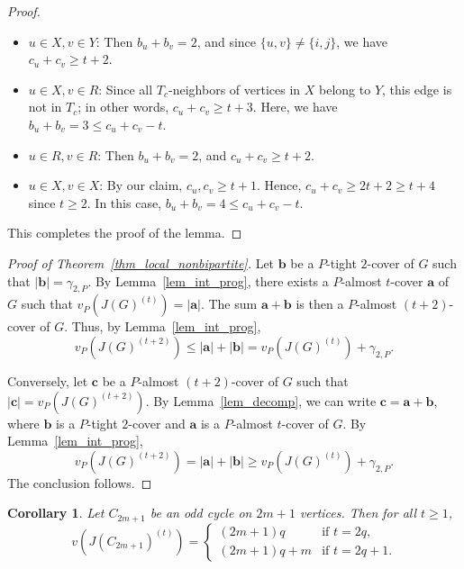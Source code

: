 \documentclass[12pt,amscd]{amsart}
\newtheorem{cor}[thm]{Corollary}
\theoremstyle{definition}
\numberwithin{equation}{section}
\begin{document}
\begin{proof}
\begin{itemize}
    \item $u \in X, v \in Y$: Then $b_u + b_v = 2$, and since $\{u,v\} \neq \{i,j\}$, we have $c_u + c_v \ge t+2$.
    \item $u \in X, v \in R$: Since all $T_c$-neighbors of vertices in $X$ belong to $Y$, this edge is not in $T_c$; in other words, $c_u + c_v \ge t+3$. Here, we have $b_u + b_v = 3 \le c_u + c_v - t$.
    \item $u \in R, v \in R$: Then $b_u + b_v = 2$, and $c_u + c_v \ge t+2$.
    \item $u \in X, v \in X$: By our claim, $c_u, c_v \ge t+1$. Hence, $c_u + c_v \ge 2t+2 \ge t + 4$ since $t \ge 2$. In this case, $b_u + b_v = 4 \le c_u + c_v - t$.
\end{itemize}

This completes the proof of the lemma.
\end{proof}


\begin{proof}[Proof of Theorem~\ref{thm_local_nonbipartite}]
Let $\mathbf{b}$ be a $P$-tight $2$-cover of $G$ such that $|\mathbf{b}| = \gamma_{2,P}$. By Lemma~\ref{lem_int_prog}, there exists a $P$-almost $t$-cover $\mathbf{a}$ of $G$ such that $v_P(J(G)^{(t)}) = |\mathbf{a}|$. The sum $\mathbf{a} + \mathbf{b}$ is then a $P$-almost $(t+2)$-cover of $G$. Thus, by Lemma~\ref{lem_int_prog},
\[
v_P(J(G)^{(t+2)}) \le |\mathbf{a}| + |\mathbf{b}| = v_P(J(G)^{(t)}) + \gamma_{2,P}.
\]

Conversely, let $\mathbf{c}$ be a $P$-almost $(t+2)$-cover of $G$ such that $|\mathbf{c}| = v_P(J(G)^{(t+2)})$. By Lemma~\ref{lem_decomp}, we can write $\mathbf{c} = \mathbf{a} + \mathbf{b}$, where $\mathbf{b}$ is a $P$-tight $2$-cover and $\mathbf{a}$ is a $P$-almost $t$-cover of $G$. By Lemma~\ref{lem_int_prog},
\[
v_P(J(G)^{(t+2)}) = |\mathbf{a}| + |\mathbf{b}| \ge v_P(J(G)^{(t)}) + \gamma_{2,P}.
\]
The conclusion follows.
\end{proof}

\begin{cor}
Let $C_{2m+1}$ be an odd cycle on $2m+1$ vertices. Then for all $t \ge 1$,
\[
v(J(C_{2m+1})^{(t)}) = \begin{cases}
    (2m+1)q & \text{if } t = 2q, \\
    (2m+1)q + m & \text{if } t = 2q+1.
\end{cases}
\]
\end{cor}
\end{document}
